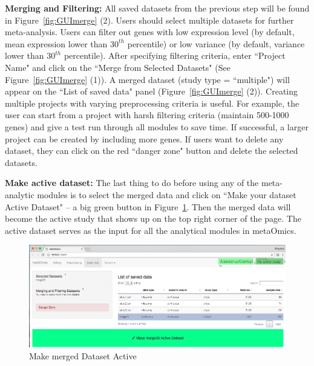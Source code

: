 \begin{steps}
\item \textbf{Merging and Filtering:}
All saved datasets from the previous step will be found in  Figure~\ref{fig:GUImerge} {\color{red} (2)}.
Users should select multiple datasets for further meta-analysis.
Users can filter out genes with low expression level (by default, mean expression lower than $30^{th}$ percentile)
or low variance (by default, variance lower than $30^{th}$ percentile).
After specifying filtering criteria, enter ``Project Name" and click on the ``Merge from Selected Datasets" (See Figure~\ref{fig:GUImerge} {\color{red} (1)}).
A merged dataset (study type = ``multiple") will appear on the ``List of saved data" panel (Figure~\ref{fig:GUImerge} {\color{red} (2)}).
Creating multiple projects with varying preprocessing criteria is useful.
For example, the user can start from a project with harsh filtering criteria (maintain 500-1000 genes) and give a test run through all modules to save time.
If successful, a larger project can be created by including more genes.
If users want to delete any dataset, they can click on the red ``danger zone" button and delete the selected datasets.

\item \textbf{Make active dataset:}
\label{sec:active}
The last thing to do before using any of the meta-analytic modules is to select the merged data and click on 
``Make your dataset Active Dataset" -- a big green button in Figure~\ref{fig:active}.
Then the merged data will become the active study that shows up on the top right corner of the page.
The active dataset serves as the input for all the analytical modules in metaOmics.

\end{steps}







\begin{figure}[H]
\begin{center}
\includegraphics[scale=1]{./figure/preprocessing/GUImarkActive}
\caption{Make merged Dataset Active}
\label{fig:active}
\end{center}
\end{figure}






